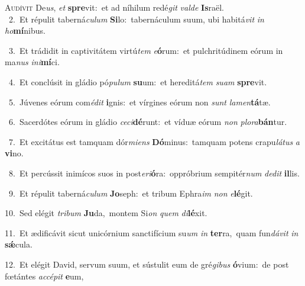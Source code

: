 \lettrine{\initial\textcolor{\initialcolor}{A}}{udívit} De\-\textit{us}\-, \textit{et} \textbf{spre}\-vit:~\star et ad níhilum redé\textit{git} \textit{val}\-\textit{de} \textbf{Is}\-raël.\\
{\numbfont\textcolor{\numbcolor}{~2.}}~Et répulit taberná\-\textit{cu}\-\textit{lum} \textbf{Si}\-lo:~\star tabernáculum suum, ubi habitá\textit{vit} \textit{in} \textit{ho}\-\textbf{mí}nibus.\par
{\numbfont\textcolor{\numbcolor}{~3.}}~Et trádidit in captivitátem virtú\textit{tem} \textit{e}\-\textbf{ó}rum:~\star et pulchritúdinem eórum in ma\textit{nus} \textit{in}\-\textit{i}\textbf{mí}ci.\par
{\numbfont\textcolor{\numbcolor}{~4.}}~Et conclúsit in gládio pó\-\textit{pu}\-\textit{lum} \textbf{su}\-um:~\star et hereditá\textit{tem} \textit{su}\-\textit{am} \textbf{spre}\-vit.\par
{\numbfont\textcolor{\numbcolor}{~5.}}~Júvenes eórum com\-\textit{é}\-\textit{dit} \textbf{i}\-gnis:~\star et vírgines eórum non \textit{sunt} \textit{la}\-\textit{men}\textbf{tá}tæ.\par
{\numbfont\textcolor{\numbcolor}{~6.}}~Sacerdótes eórum in gládio \textit{ce}\-\textit{ci}\textbf{dé}runt:~\star et víduæ eórum \textit{non} \textit{plo}\-\textit{ra}\textbf{bán}tur.\par
{\numbfont\textcolor{\numbcolor}{~7.}}~Et excitátus est tamquam dór\-\textit{mi}\-\textit{ens} \textbf{Dó}\-minus:~\star tamquam potens crapu\-\textit{lá}\-\textit{tus} \textit{a} \textbf{vi}\-no.\par
{\numbfont\textcolor{\numbcolor}{~8.}}~Et percússit inimícos suos in post\-\textit{e}\-\textit{ri}\textbf{ó}ra:~\star oppróbrium sempitér\textit{num} \textit{de}\-\textit{dit} \textbf{il}\-lis.\par
{\numbfont\textcolor{\numbcolor}{~9.}}~Et répulit taberná\-\textit{cu}\-\textit{lum} \textbf{Jo}\-seph:~\star et tribum Ephra\textit{im} \textit{non} \textit{e}\-\textbf{lé}git.\par
{\numbfont\textcolor{\numbcolor}{10.}}~Sed elégit \textit{tri}\-\textit{bum} \textbf{Ju}\-da,~\star montem Si\textit{on} \textit{quem} \textit{di}\-\textbf{lé}xit.\par
{\numbfont\textcolor{\numbcolor}{11.}}~Et ædificávit sicut unicórnium sanctifícium su\textit{um} \textit{in} \textbf{ter}\-ra,~\star quam fun\-\textit{dá}\-\textit{vit} \textit{in} \textbf{sǽ}\-cula.\par
{\numbfont\textcolor{\numbcolor}{12.}}~Et elégit David, servum suum, et sústulit eum de gré\-\textit{gi}\-\textit{bus} \textbf{ó}\-vium:~\star de post fœtántes \textit{ac}\-\textit{cé}\textit{pit} \textbf{e}\-um,\par
